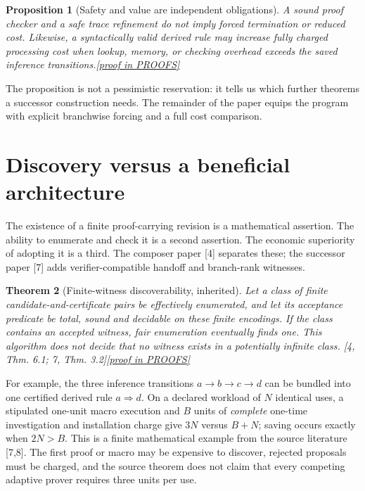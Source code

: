 \documentclass[11pt,letterpaper]{article}
\newtheorem{theorem}{Theorem}[section]
\newtheorem{proposition}[theorem]{Proposition}
\theoremstyle{definition}
\theoremstyle{remark}
\newcommand{\prooflink}[1]{\hfill\hyperlink{proof:#1}{\footnotesize[proof in PROOFS]}}
\newcommand{\src}[1]{\textup{[#1]}}
\begin{document}
\begin{proposition}[Safety and value are independent obligations]\label{prop:safety}\hypertarget{claim:safety}{}
A sound proof checker and a safe trace refinement do not imply forced termination or reduced cost. Likewise, a syntactically valid derived rule may increase fully charged processing cost when lookup, memory, or checking overhead exceeds the saved inference transitions.\prooflink{safety}
\end{proposition}

The proposition is not a pessimistic reservation: it tells us which further theorems a successor construction needs. The remainder of the paper equips the program with explicit branchwise forcing and a full cost comparison.

\section{Discovery versus a beneficial architecture}
The existence of a finite proof-carrying revision is a mathematical assertion. The ability to enumerate and check it is a second assertion. The economic superiority of adopting it is a third. The composer paper \src{4} separates these; the successor paper \src{7} adds verifier-compatible handoff and branch-rank witnesses.

\begin{theorem}[Finite-witness discoverability, inherited]\label{thm:enumerate}\hypertarget{claim:enumerate}{}
Let a class of finite candidate-and-certificate pairs be effectively enumerated, and let its acceptance predicate be total, sound and decidable on these finite encodings. If the class contains an accepted witness, fair enumeration eventually finds one. This algorithm does not decide that no witness exists in a potentially infinite class. \src{4, Thm. 6.1; 7, Thm. 3.2}\prooflink{enumerate}
\end{theorem}

For example, the three inference transitions $a\to b\to c\to d$ can be bundled into one certified derived rule $a\Rightarrow d$. On a declared workload of $N$ identical uses, a stipulated one-unit macro execution and $B$ units of \emph{complete} one-time investigation and installation charge give $3N$ versus $B+N$; saving occurs exactly when $2N>B$. This is a finite mathematical example from the source literature \src{7,8}. The first proof or macro may be expensive to discover, rejected proposals must be charged, and the source theorem does not claim that every competing adaptive prover requires three units per use.
\end{document}
